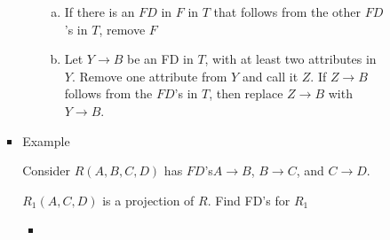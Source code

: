 \documentclass[12pt]{article}
\begin{document}
\begin{enumerate}[1.]
\begin{enumerate}[a)]
\begin{itemize}
\begin{itemize}
\begin{enumerate}[1.]
                    \begin{enumerate}[a)]
                        \item If there is an $FD$ in $F$ in $T$ that follows from
                        the other $FD$'s in $T$, remove $F$
                        \item Let $Y \to B$ be an FD in $T$, with at least two
                        attributes in $Y$. Remove one attribute from $Y$ and call
                        it $Z$. If $Z \to B$ follows from the $FD$'s in $T$, then
                        replace $Z \to B$ with $Y \to B$.
                    \end{enumerate}
                \end{enumerate}
                \item Example

                \bigskip

                Consider $R(A,B,C,D)$ has $FD$'s$A \to B$, $B \to C$, and $C \to D$.

                $R_1(A,C,D)$ is a projection of $R$. Find FD's for $R_1$

                \begin{itemize}
                    \item
                \end{itemize}
            \end{itemize}
        \end{itemize}
    \end{enumerate}

\end{enumerate}
\end{document}
